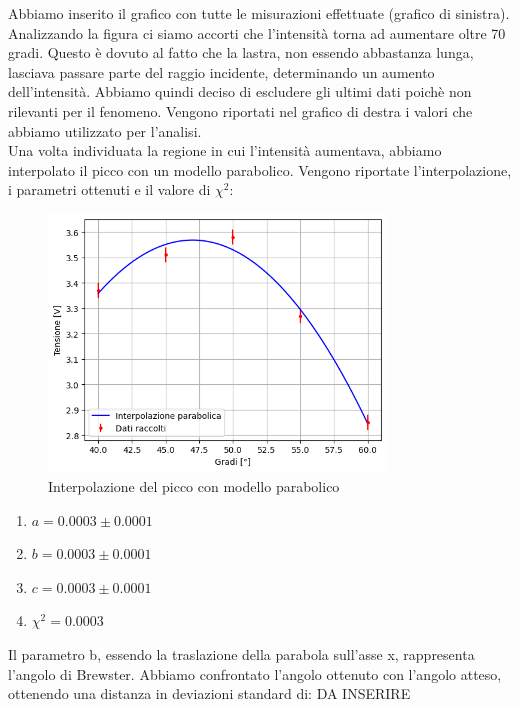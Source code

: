 \documentclass[letterpaper,12pt]{article}
\begin{document}
Abbiamo inserito il grafico con tutte le misurazioni effettuate (grafico di sinistra). Analizzando la figura ci
siamo accorti che l'intensità torna ad aumentare oltre 70 gradi. Questo è dovuto al fatto che la lastra, non essendo
abbastanza lunga, lasciava passare parte del raggio incidente, determinando un aumento dell'intensità. Abbiamo quindi
deciso di escludere gli ultimi dati poichè non rilevanti per il fenomeno. Vengono riportati nel grafico di destra
i valori che abbiamo utilizzato per l'analisi.\\
Una volta individuata la regione in cui l'intensità aumentava, abbiamo interpolato il picco con un modello parabolico.
Vengono riportate l'interpolazione, i parametri ottenuti e il valore di $\chi^2$:

\begin{figure}[h!]
    \centering
    \includegraphics[width = 0.8\textwidth]{brew_angle.png}
    \caption{Interpolazione del picco con modello parabolico}
    \label{fig:parabola}
\end{figure}

\begin{enumerate}
    \item $a = 0.0003 \pm 0.0001$
    \item $b = 0.0003 \pm 0.0001$
    \item $c = 0.0003 \pm 0.0001$
    \item $\chi^2 = 0.0003$
\end{enumerate}

Il parametro b, essendo la traslazione della parabola sull'asse x, rappresenta l'angolo di Brewster. Abbiamo 
confrontato l'angolo ottenuto con l'angolo atteso, ottenendo una distanza in deviazioni standard di: DA INSERIRE\\
\end{document}
